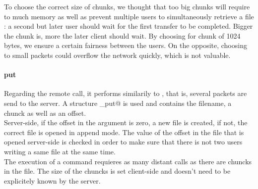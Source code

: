 \documentclass{article}
\begin{document}
To choose the correct size of chunks, we thought that too big chunks will require to much memory as well as prevent multiple users to simultaneously retrieve a file : a second but later user should wait for the first transfer to be completed. Bigger the chunk is, more the later client should wait. By choosing for chunk of 1024 bytes, we ensure a certain fairness between the users. On the opposite, choosing to small packets could overflow the network quickly, which is not valuable.

\paragraph{put} Regarding the \verb@put@ remote call, it performs similarily to \verb@get@, that is, several packets are send to the server. A structure \verb@file_put@ is used and contains the filename, a chunck as well as an offset.\\

Server-side, if the offset in the argument is zero, a new file is created, if not, the correct file is opened in append mode. The value of the offset in the file that is opened server-side is checked in order to make sure that there is not two users writing a same file at the same time.\\

The execution of a \verb@put@ command requieres as many distant calls as there are chuncks in the file. The size of the chuncks is set client-side and doesn't need to be explicitely known by the server.
 
\end{document}
